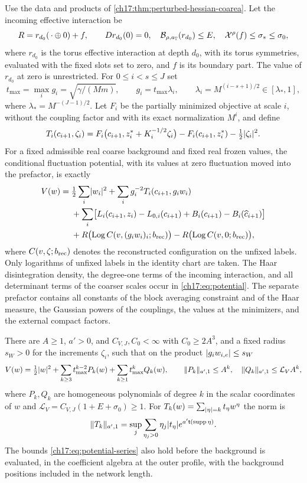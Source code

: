 \begin{lemma}\label{ch17:lem:complete-white-potential}
Use the data and products of \cref{ch17:thm:perturbed-hessian-coarea}. Let the incoming effective interaction be
\[
 R=r_{d_0}(\,\cdot\oplus0)+f,\qquad Dr_{d_0}(0)=0,\quad\mathcal B_{\rho,a_{\mathbb T}}(r_{d_0})\le E,\quad\mathcal X^\rho(f)\le\sigma_*\le\sigma_0,
\]
where $r_{d_0}$ is the torus effective interaction at depth $d_0$, with its torus symmetries, evaluated with the fixed slots set to zero, and $f$ is its boundary part. The value of $r_{d_0}$ at zero is unrestricted. For $0\le i<s\le J$ set
\[
 t_{\max}=\max_ig_i=\sqrt{\gamma/(Mm)},\qquad g_i=t_{\max}\lambda_i,\qquad\lambda_i=M^{(i-s+1)/2}\in[\lambda_*,1],
\]
where $\lambda_*=M^{-(J-1)/2}$. Let $F_i$ be the partially minimized objective at scale $i$, without the coupling factor and with its exact normalization $M^i$, and define
\[
 T_i(c_{i+1},\zeta_i)=F_i\bigl(c_{i+1},z_i^*+K_i^{-1/2}\zeta_i\bigr)-F_i(c_{i+1},z_i^*)-\tfrac12\lvert \zeta_i\rvert^2.
\]
For a fixed admissible real coarse background and fixed real frozen values, the conditional fluctuation potential, with its values at zero fluctuation moved into the prefactor, is exactly
\begin{equation}\label{ch17:eq:potential}
\begin{split}
 V(w)={}&\tfrac12\sum_i\lvert w_i\rvert^2+\sum_ig_i^{-2}T_i(c_{i+1},g_iw_i)\\
 &+\sum_i\bigl[L_i(c_{i+1},z_i)-L_{0,i}(c_{i+1})+B_i(c_{i+1})-B_i(\widehat c_{i+1})\bigr]\\
 &+R\bigl(\operatorname{Log} C(v,(g_iw_i)_i;b_{\mathrm{rec}})\bigr)-R\bigl(\operatorname{Log} C(v,0;b_{\mathrm{rec}})\bigr),
\end{split}
\end{equation}
where $C(v,\zeta;b_{\mathrm{rec}})$ denotes the reconstructed configuration on the unfixed labels. Only logarithms of unfixed labels in the identity chart are taken. The Haar disintegration density, the degree-one terms of the incoming interaction, and all determinant terms of the coarser scales occur in \eqref{ch17:eq:potential}. The separate prefactor contains all constants of the block averaging constraint and of the Haar measure, the Gaussian powers of the couplings, the values at the minimizers, and the external compact factors.

There are $A\ge1$, $a'>0$, and $C_{V,J},C_0<\infty$ with $C_0\ge2A^3$, and a fixed radius $s_W>0$ for the increments $\zeta_i$, such that on the product $\lvert g_iw_{i,e}\rvert\le s_W$
\begin{equation}\label{ch17:eq:potential-series}
 V(w)=\tfrac12\lvert w\rvert^2+\sum_{k\ge3}t_{\max}^{k-2}P_k(w)+\sum_{k\ge1}t_{\max}^kQ_k(w),\qquad\lVert P_k\rVert_{a',1}\le A^k,\quad\lVert Q_k\rVert_{a',1}\le\mathcal L_VA^k,
\end{equation}
where $P_k,Q_k$ are homogeneous polynomials of degree $k$ in the scalar coordinates of $w$ and $\mathcal L_V=C_{V,J}(1+E+\sigma_0)\ge1$. For $T_k(w)=\sum_{\lvert \eta\rvert=k}t_\eta w^\eta$ the norm is
\[
 \lVert T_k\rVert_{a',1}=\sup_j\sum_{\eta_j>0}\eta_j\lvert t_\eta\rvert e^{a'\mathsf t(\operatorname{supp}\eta)}.
\]
The bounds \eqref{ch17:eq:potential-series} also hold before the background is evaluated, in the coefficient algebra at the outer profile, with the background positions included in the network length.


\end{lemma}
